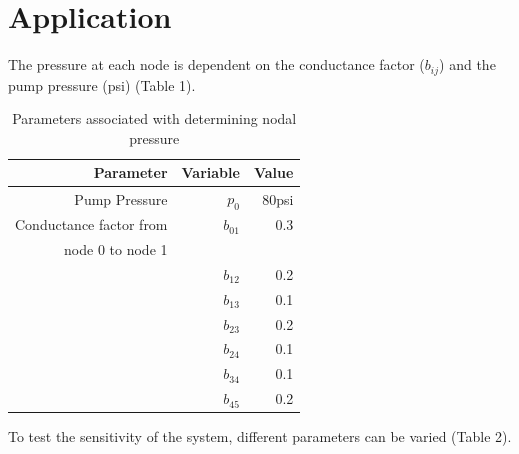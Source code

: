 \documentclass[titlepage,12pt,onehalfspacing]{article}
\begin{document}
\section{Application}
The pressure at each node is dependent on the conductance factor
($b_{ij}$) and the pump pressure (psi) (Table 1).
\begin{table}[h]
\begin{center}
\caption{Parameters associated with determining nodal pressure}
\begin{tabular}[!h]{|r|r|r|}
\hline
{\bf Parameter} & {\bf Variable} & {\bf Value} \\
\hline
Pump Pressure & $p_0$ & 80psi \\
\hline
Conductance factor from & $b_{01}$ &   0.3 \\

node 0 to node 1 &       &       \\
\hline
      & $b_{12}$ &   0.2 \\
\hline
      & $b_{13}$ &   0.1 \\
\hline
      & $b_{23}$ &   0.2 \\
\hline
      & $b_{24}$ &   0.1 \\
\hline
      & $b_{34}$ &   0.1 \\
\hline
      & $b_{45}$ &   0.2 \\
\hline
\end{tabular}
\end{center}
\end{table}

To test the sensitivity of the system, different parameters can be
varied (Table 2).
\end{document}

